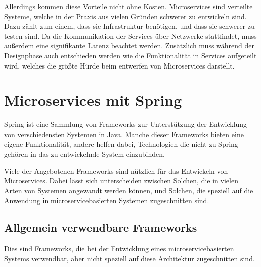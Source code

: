 \documentclass{article}
\begin{document}
Allerdings kommen diese Vorteile nicht ohne Kosten.
Microservices sind verteilte Systeme, welche in der Praxis aus vielen Gründen schwerer zu entwickeln sind.
Dazu zählt zum einem, dass sie Infrastruktur benötigen, und dass sie schwerer zu testen sind.
Da die Kommunikation der Services über Netzwerke stattfindet, muss außerdem eine signifikante Latenz beachtet werden.\cite{MATT}
Zusätzlich muss während der Designphase auch entschieden werden wie die Funktionalität in Services aufgeteilt wird, welches die größte Hürde beim entwerfen von Microservices darstellt.\cite{SCASASD}

\section{Microservices mit Spring}

Spring ist eine Sammlung von Frameworks zur Unterstützung der Entwicklung von verschiedensten Systemen in Java.
Manche dieser Frameworks bieten eine eigene Funktionalität, andere helfen dabei, Technologien die nicht zu Spring gehören in das zu entwickelnde System einzubinden.

Viele der Angebotenen Frameworks sind nützlich für das Entwickeln von Microservices.
Dabei lässt sich unterscheiden zwischen Solchen, die in vielen Arten von Systemen angewandt werden können, und Solchen, die speziell auf die Anwendung in microservicebasierten Systemen zugeschnitten sind.

\subsection{Allgemein verwendbare Frameworks}

Dies sind Frameworks, die bei der Entwicklung eines microservicebasierten Systems verwendbar, aber nicht speziell auf diese Architektur zugeschnitten sind.
\end{document}
